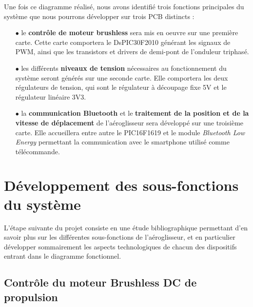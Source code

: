 \documentclass[a4paper,12pt]{report}
\begin{document}
	Une fois ce diagramme réalisé, nous avons identifié trois fonctions principales du système que nous pourrons développer sur trois PCB distincts :
	
	\vspace{-0.5em}
	
	\begin{itemize}
		\item[$\bullet$] le \textbf{contrôle de moteur brushless} sera mis en oeuvre sur une première carte. Cette carte comportera le DsPIC30F2010 générant les signaux de PWM, ainsi que les transistors et drivers de demi-pont de l'onduleur triphasé.
		\item[$\bullet$] les différents \textbf{niveaux de tension} nécessaires au fonctionnement du système seront générés sur une seconde carte. Elle comportera les deux régulateurs de tension, qui sont le régulateur à découpage fixe 5V et le régulateur linéaire 3V3.
		\item[$\bullet$] la \textbf{communication Bluetooth} et le \textbf{traitement de la position et de la vitesse de déplacement} de l'aéroglisseur sera développé sur une troisième carte. Elle accueillera entre autre le PIC16F1619 et le module \textit{Bluetooth Low Energy} permettant la communication avec le smartphone utilisé comme télécommande.
		
	\end{itemize}
	
	\section{Développement des sous-fonctions du système}
	
		\vspace{-1em}
	
		L'étape suivante du projet consiste en une étude bibliographique permettant d'en savoir plus sur les différentes sous-fonctions de l'aéroglisseur, et en particulier développer sommairement les aspects technologiques de chacun des dispositifs entrant dans le diagramme fonctionnel.
		
		\vspace{-1em}
		
		\subsection{Contrôle du moteur Brushless DC de propulsion}
		
		\vspace{-1em}
		
\end{document}
